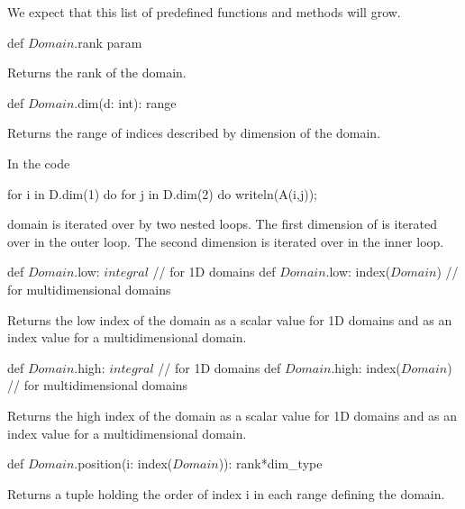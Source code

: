 We expect that this list of predefined functions and methods will
grow.

\begin{protohead}
def $Domain$.rank param
\end{protohead}
\begin{protobody}
Returns the rank of the domain.
\end{protobody}

\begin{protohead}
def $Domain$.dim(d: int): range
\end{protohead}
\begin{protobody}
Returns the range of indices described by dimension  of the
domain.
\end{protobody}

\begin{example}
In the code
\begin{chapel}
for i in D.dim(1) do
  for j in D.dim(2) do
    writeln(A(i,j));
\end{chapel}
domain  is iterated over by two nested loops.  The first
dimension of  is iterated over in the outer loop.  The second
dimension is iterated over in the inner loop.
\end{example}


\begin{protohead}
def $Domain$.low: $integral$        // for 1D domains
def $Domain$.low: index($Domain$)   // for multidimensional domains
\end{protohead}
\begin{protobody}
Returns the low index of the domain as a scalar value for 1D domains
and as an index value for a multidimensional domain.
\end{protobody}

\begin{protohead}
def $Domain$.high: $integral$        // for 1D domains
def $Domain$.high: index($Domain$)   // for multidimensional domains
\end{protohead}
\begin{protobody}
Returns the high index of the domain as a scalar value for 1D domains
and as an index value for a multidimensional domain.
\end{protobody}

\begin{protohead}
def $Domain$.position(i: index($Domain$)): rank*dim_type
\end{protohead}
\begin{protobody}
Returns a tuple holding the order of index i in each range defining
the domain.
\end{protobody}


